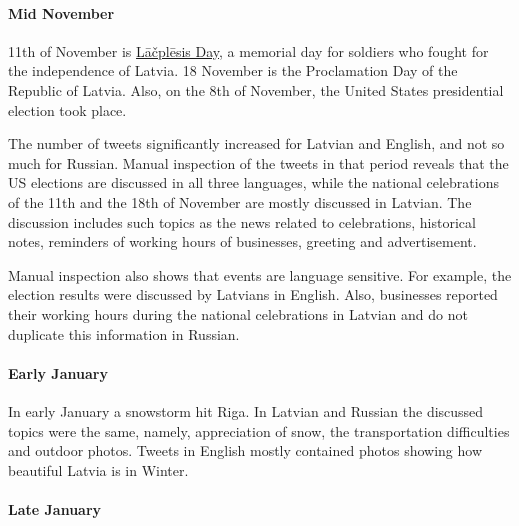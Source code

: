 \documentclass[11pt,a4paper]{article}
\begin{document}
\paragraph{Mid November}

11th of November is \href{https://en.wikipedia.org/wiki/L\%C4\%81\%C4\%8Dpl\%C4\%93sis_Day}{L\={a}\v{c}pl\={e}sis Day}, a memorial day for soldiers who fought for the independence of Latvia. 18 November is the Proclamation Day of the Republic of Latvia. Also, on the 8th of November, the 
United States presidential election took place.

The number of tweets significantly increased for Latvian and English, and not so much for Russian. Manual inspection of the tweets in that period reveals that the US elections are discussed in all three languages, while the national celebrations of the 11th and the 18th of November are mostly discussed in Latvian. The discussion includes such topics as the news related to celebrations, historical notes, reminders of working hours of businesses, greeting and advertisement.

Manual inspection also shows that events are language sensitive. For example, the election results were discussed by Latvians in English. Also, businesses reported their working hours during the national celebrations in Latvian and do not duplicate this information in Russian.



\paragraph{Early January}

In early January a snowstorm hit Riga. In Latvian and Russian the discussed topics were the same, namely, appreciation of snow, the transportation difficulties and outdoor photos. Tweets in English mostly contained photos showing how beautiful Latvia is in Winter.

\paragraph{Late January}


\end{document}

